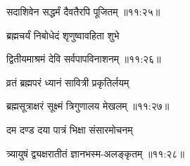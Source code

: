 
{\devanagarifont सदाशिवेन सद्धर्मं दैवतैरपि पूजितम् {॥११:२५॥} \veg\dontdisplaylinenum }%


 
{\devanagarifont ब्रह्मचर्यं निबोधेदं शृणुष्वावहिता शुभे \thinspace{\dandab} \dontdisplaylinenum }%


{\devanagarifont द्वितीयमाश्रमं देवि सर्वपापविनाशनम् {॥११:२६॥} \veg\dontdisplaylinenum }%

{\devanagarifont व्रतं ब्रह्मपरं ध्यानं सावित्री प्रकृतिर्लयम् \thinspace{\dandab} \dontdisplaylinenum }%


{\devanagarifont ब्रह्मसूत्राक्षरं सूक्ष्मं त्रिगुणालय मेखलम् {॥११:२७॥} \veg\dontdisplaylinenum }%

{\devanagarifont दम दण्ड दया पात्रं भिक्षा संसारमोचनम् \thinspace{\dandab} \dontdisplaylinenum }%


{\devanagarifont त्र्यायुषं द्व्यक्षरातीतं ज्ञानभस्म-अलङ्कृतम् {॥११:२८॥} \veg\dontdisplaylinenum }%

